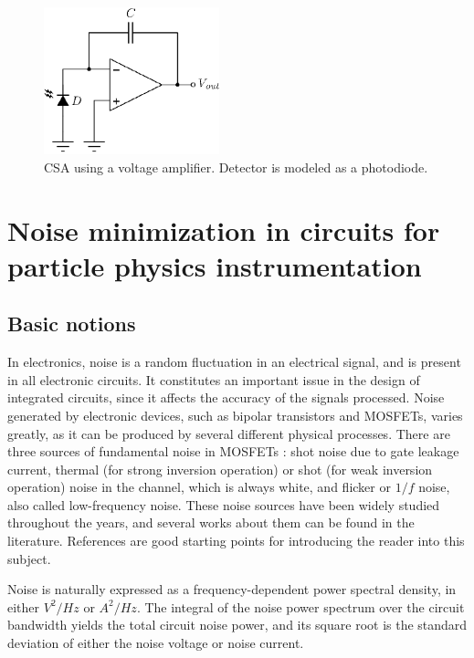 \begin{figure}[!t]
	\centering
	\includegraphics[width=2in]{./Figures/csa_post}
	\caption{CSA using a voltage amplifier. Detector is modeled as a photodiode.}\label{fig:csa_post}
\end{figure}


\section{Noise minimization in circuits for particle physics instrumentation}
\subsection{Basic notions}
In electronics, noise is a random fluctuation in an electrical signal, and is present in all electronic circuits. It constitutes an important issue in the design of integrated circuits, since it affects the accuracy of the signals processed. Noise generated by electronic devices, such as bipolar transistors and MOSFETs, varies greatly, as it can be produced by several different physical processes. There are three sources of fundamental noise in MOSFETs \citep{gray101}: shot noise due to gate leakage current, thermal (for strong inversion operation) or shot (for weak inversion operation) noise in the channel, which is always white, and flicker or $1/f$ noise, also called low-frequency noise. These noise sources have been widely studied throughout the years, and several works about them can be found in the literature. References \citep{gray101,jindal101} are good starting points for introducing the reader into this subject.

Noise is naturally expressed as a frequency-dependent power spectral density, in either $V^2/\textit{Hz}$ or $A^2/\textit{Hz}$. The integral of the noise power spectrum over the circuit bandwidth yields the total circuit noise power, and its square root is the standard deviation of either the noise voltage or noise current.

